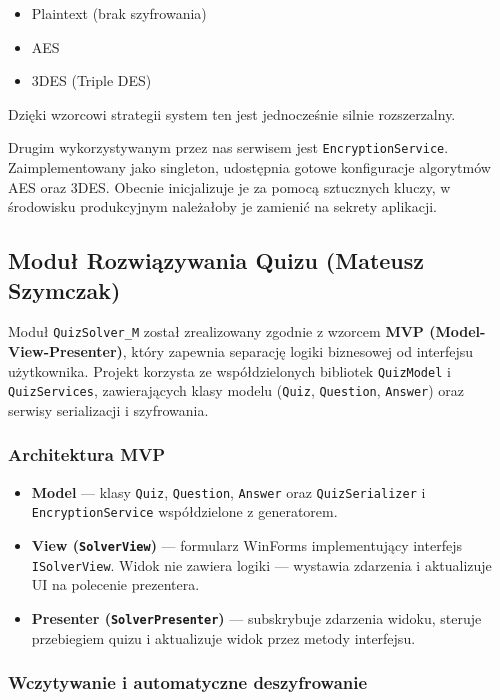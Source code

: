 \documentclass[12pt,a4paper]{article}
\begin{document}
\begin{itemize}
    \item Plaintext (brak szyfrowania)
    \item AES
    \item 3DES (Triple DES)
\end{itemize}

\noindent
Dzięki wzorcowi strategii system ten jest jednocześnie silnie rozszerzalny.

Drugim wykorzystywanym przez nas serwisem jest \verb|EncryptionService|. Zaimplementowany
jako singleton, udostępnia gotowe konfiguracje algorytmów AES oraz 3DES. Obecnie inicjalizuje
je za pomocą sztucznych kluczy, w środowisku produkcyjnym należałoby je zamienić na sekrety
aplikacji.

\subsection{Moduł Rozwiązywania Quizu (Mateusz Szymczak)}

Moduł \texttt{QuizSolver\_M} został zrealizowany zgodnie z wzorcem \textbf{MVP (Model-View-Presenter)},
który zapewnia separację logiki biznesowej od interfejsu użytkownika.
Projekt korzysta ze współdzielonych bibliotek \texttt{QuizModel} i \texttt{QuizServices},
zawierających klasy modelu (\texttt{Quiz}, \texttt{Question}, \texttt{Answer})
oraz serwisy serializacji i szyfrowania.

\subsubsection{Architektura MVP}

\begin{itemize}
    \item \textbf{Model} --- klasy \texttt{Quiz}, \texttt{Question}, \texttt{Answer}
          oraz \texttt{QuizSerializer} i \texttt{EncryptionService} współdzielone z generatorem.
    \item \textbf{View (\texttt{SolverView})} --- formularz WinForms implementujący interfejs
          \texttt{ISolverView}. Widok nie zawiera logiki --- wystawia zdarzenia i aktualizuje UI
          na polecenie prezentera.
    \item \textbf{Presenter (\texttt{SolverPresenter})} --- subskrybuje zdarzenia widoku,
          steruje przebiegiem quizu i aktualizuje widok przez metody interfejsu.
\end{itemize}

\subsubsection{Wczytywanie i automatyczne deszyfrowanie}
\end{document}
